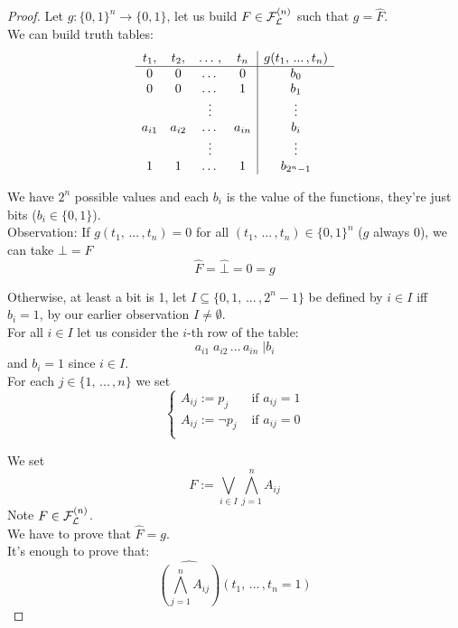\documentclass[11pt]{article}
\begin{document}
	\begin{proof}
		Let $g: \{0,1\}^n \rightarrow \{0,1\}$, let us build $F \in \mathcal{F}_\mathcal{L}^{(n)}$ such that $g = \hat F$.\\
		We can build truth tables: 
		$$
		\begin{array}{c c c c | c}
			t_1, & t_2, & \dots \, , & t_n & g (t_1, \, ... \, , t_n) \\
			\hline 
			0 & 0 & \dots & 0 & b_0 \\
			0 & 0 & \dots & 1 & b_1 \\
			&& \vdots && \vdots \\
			a_{i1} & a_{i2} & \dots & a_{in} & b_i \\
			&& \vdots && \vdots \\
			1 & 1 & \dots & 1 & b_{2^{n}-1} \\
		\end{array}
		$$
		
		We have $2^n$ possible values and each $b_i$ is the value of the functions, they're just bits ($b_i \in \{0,1\}$).\\
		
		Observation: If $g(t_1, \, ... \, , t_n) = 0$ for all $(t_1, \, ... \, , t_n) \in \{0,1\}^n$ ($g$ always $0$), we can take $\bot = F$
		$$ \hat F = \hat \bot = 0 = g $$
		
		Otherwise, at least a bit is 1, let $I \subseteq \{0,1, \, ... \, , 2^{n}-1\}$ be defined by $i \in I$ iff $b_i = 1$, by our earlier observation $I \neq \emptyset$.\\
		
		For all $i \in I$ let us consider the $i$-th row of the table:
		$$ a_{i1} \; a_{i2} \, ... \, a_{in} \; | b_i $$
		and $b_i =1$ since $i \in I$.\\
		
		For each $j \in \{1, \, ... \, , n\}$ we set
		$$ 
		\begin{cases}
			A_{ij}:= p_j & \text{ if } a_{ij} = 1 \\
			A_{ij}:= \neg p_j & \text{ if } a_{ij} = 0 \\
		\end{cases}
		$$
		
		We set
		$$ F := \bigvee_{i \in I} \bigwedge_{j=1}^n A_{ij} $$
		Note $F \in \mathcal{F}_\mathcal{L}^{(n)}$.\\
		
		We have to prove that $\hat F = g$.\\
		
		It's enough to prove that: 
		$$\widehat{\left(\bigwedge_{j=1}^n A_{ij}\right)} (t_1, \, ... \, , t_n = 1) $$
		

\end{proof}
\end{document}

